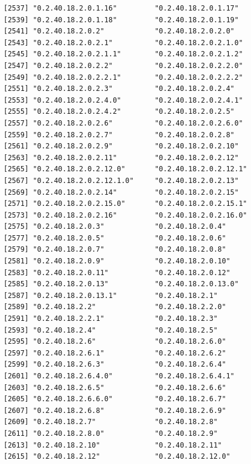 \documentclass[
  letterpaper,
  DIV=11,
  numbers=noendperiod]{scrreprt}
\begin{document}
\begin{verbatim}
[2537] "0.2.40.18.2.0.1.16"         "0.2.40.18.2.0.1.17"        
[2539] "0.2.40.18.2.0.1.18"         "0.2.40.18.2.0.1.19"        
[2541] "0.2.40.18.2.0.2"            "0.2.40.18.2.0.2.0"         
[2543] "0.2.40.18.2.0.2.1"          "0.2.40.18.2.0.2.1.0"       
[2545] "0.2.40.18.2.0.2.1.1"        "0.2.40.18.2.0.2.1.2"       
[2547] "0.2.40.18.2.0.2.2"          "0.2.40.18.2.0.2.2.0"       
[2549] "0.2.40.18.2.0.2.2.1"        "0.2.40.18.2.0.2.2.2"       
[2551] "0.2.40.18.2.0.2.3"          "0.2.40.18.2.0.2.4"         
[2553] "0.2.40.18.2.0.2.4.0"        "0.2.40.18.2.0.2.4.1"       
[2555] "0.2.40.18.2.0.2.4.2"        "0.2.40.18.2.0.2.5"         
[2557] "0.2.40.18.2.0.2.6"          "0.2.40.18.2.0.2.6.0"       
[2559] "0.2.40.18.2.0.2.7"          "0.2.40.18.2.0.2.8"         
[2561] "0.2.40.18.2.0.2.9"          "0.2.40.18.2.0.2.10"        
[2563] "0.2.40.18.2.0.2.11"         "0.2.40.18.2.0.2.12"        
[2565] "0.2.40.18.2.0.2.12.0"       "0.2.40.18.2.0.2.12.1"      
[2567] "0.2.40.18.2.0.2.12.1.0"     "0.2.40.18.2.0.2.13"        
[2569] "0.2.40.18.2.0.2.14"         "0.2.40.18.2.0.2.15"        
[2571] "0.2.40.18.2.0.2.15.0"       "0.2.40.18.2.0.2.15.1"      
[2573] "0.2.40.18.2.0.2.16"         "0.2.40.18.2.0.2.16.0"      
[2575] "0.2.40.18.2.0.3"            "0.2.40.18.2.0.4"           
[2577] "0.2.40.18.2.0.5"            "0.2.40.18.2.0.6"           
[2579] "0.2.40.18.2.0.7"            "0.2.40.18.2.0.8"           
[2581] "0.2.40.18.2.0.9"            "0.2.40.18.2.0.10"          
[2583] "0.2.40.18.2.0.11"           "0.2.40.18.2.0.12"          
[2585] "0.2.40.18.2.0.13"           "0.2.40.18.2.0.13.0"        
[2587] "0.2.40.18.2.0.13.1"         "0.2.40.18.2.1"             
[2589] "0.2.40.18.2.2"              "0.2.40.18.2.2.0"           
[2591] "0.2.40.18.2.2.1"            "0.2.40.18.2.3"             
[2593] "0.2.40.18.2.4"              "0.2.40.18.2.5"             
[2595] "0.2.40.18.2.6"              "0.2.40.18.2.6.0"           
[2597] "0.2.40.18.2.6.1"            "0.2.40.18.2.6.2"           
[2599] "0.2.40.18.2.6.3"            "0.2.40.18.2.6.4"           
[2601] "0.2.40.18.2.6.4.0"          "0.2.40.18.2.6.4.1"         
[2603] "0.2.40.18.2.6.5"            "0.2.40.18.2.6.6"           
[2605] "0.2.40.18.2.6.6.0"          "0.2.40.18.2.6.7"           
[2607] "0.2.40.18.2.6.8"            "0.2.40.18.2.6.9"           
[2609] "0.2.40.18.2.7"              "0.2.40.18.2.8"             
[2611] "0.2.40.18.2.8.0"            "0.2.40.18.2.9"             
[2613] "0.2.40.18.2.10"             "0.2.40.18.2.11"            
[2615] "0.2.40.18.2.12"             "0.2.40.18.2.12.0"          

\end{verbatim}
\end{document}
